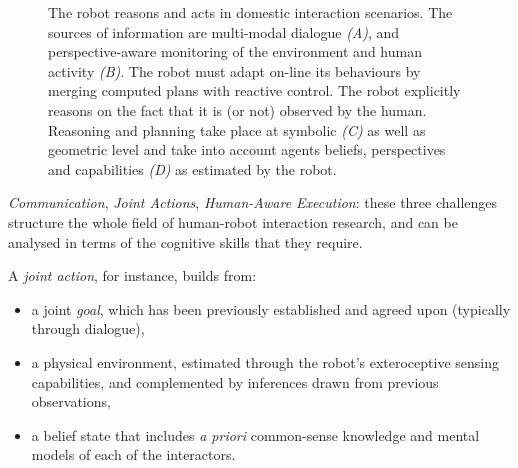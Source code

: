\documentclass[preprint,3p,times]{elsarticle}
\begin{document}
\begin{figure}[htb]
\centering
{}

\caption{The robot reasons and acts in domestic interaction scenarios.  The
    sources of information are multi-modal dialogue {\it (A)}, and
    perspective-aware monitoring of the environment and human activity {\it
    (B)}. The robot must adapt on-line its behaviours by merging computed plans
    with reactive control. The robot explicitly reasons on the fact that it is
    (or not) observed by the human. Reasoning and planning take place at
    symbolic {\it (C)} as well as geometric level and take into account agents
    beliefs, perspectives and capabilities {\it (D)} as estimated by the robot.}

\label{fig:hri-dec}
\end{figure}

\emph{Communication}, \emph{Joint Actions}, \emph{Human-Aware Execution}: these
three challenges structure the whole field of human-robot interaction research,
and can be analysed in terms of the cognitive skills that they require.

A \emph{joint action}, for instance, builds from:

\begin {itemize}
    \item a joint \emph{goal}, which has been previously established and agreed
        upon (typically through dialogue),
    
    \item a physical environment, estimated through the robot's exteroceptive
        sensing capabilities, and complemented by inferences drawn from previous
        observations,
    
    \item a belief state that includes {\it a priori} common-sense knowledge and
        mental models of each of the interactors.

\end {itemize}
\end{document}
